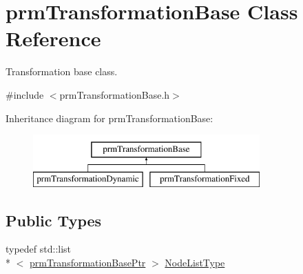 \hypertarget{classprm_transformation_base}{\section{prm\-Transformation\-Base Class Reference}
\label{classprm_transformation_base}
}


Transformation base class.  




{\ttfamily \#include $<$prm\-Transformation\-Base.\-h$>$}

Inheritance diagram for prm\-Transformation\-Base\-:\begin{figure}[H]
\begin{center}
\leavevmode
\includegraphics[height=2.000000cm]{d5/d7b/classprm_transformation_base}
\end{center}
\end{figure}
\subsection*{Public Types}
\begin{DoxyCompactItemize}
\item 
typedef std\-::list\\*
$<$ \hyperlink{prm_transformation_base_8h_a881a6a7d2191474974cdf36d79e1df08}{prm\-Transformation\-Base\-Ptr} $>$ \hyperlink{classprm_transformation_base_a577eae3ee032e09a9ebb774081828d5c}{Node\-List\-Type}
\end{DoxyCompactItemize}
